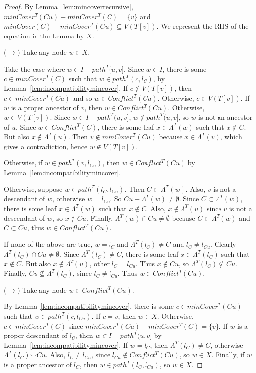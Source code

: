 \documentclass[final,1p,times]{elsarticle}
\newcommand{\compatible}{\smile}
\newcommand{\leafset}{\Lambda}
\begin{document}
        \begin{proof}
            By Lemma~\ref{lem:mincoverrecursive}, $minCover^{T}(Cu) - minCover^{T}(C) = \{v\}$ and $minCover(C) - minCover^{T}(Cu) \subseteq V(T[v])$. We represent the RHS of the equation in the Lemma by $X$.

		($\longrightarrow$) Take any node $w \in X$.

            Take the case where $w \in I - path^{T}(u, v]$. Since $w \in I$, there is some $c \in minCover^{T}(C)$ such that $w \in path^{T}(c, l_{C})$, by Lemma~\ref{lem:incompatibilitymincover}. If $c \not\in V(T[v])$, then $c \in minCover^{T}(Cu)$ and so $w \in Conflict^{T}(Cu)$. Otherwise, $c \in V(T[v])$. If $w$ is a proper ancestor of $v$, then $w \in Conflict^{T}(Cu)$. Otherwise, $w \in V(T[v])$. Since $w \in I - path^{T}(u, v]$, $w \not\in path^{T}(u, v]$, so $w$ is not an ancestor of $u$. Since $w \in Conflict^{T}(C)$, there is some leaf $x \in \leafset^{T}(w)$ such that $x \not\in C$. But also $x \not\in \leafset^{T}(u)$. Then $v \not\in minCover^{T}(Cu)$ because $x \in \leafset^{T}(v)$, which gives a contradiction, hence $w \not\in V(T[v])$.

            Otherwise, if $w \in path^{T}(v, l_{Cu})$, then $w \in Conflict^{T}(Cu)$ by Lemma~\ref{lem:incompatibilitymincover}.

            Otherwise, suppose $w \in path^{T}(l_C, l_{Cu})$. Then $C \subset \leafset^{T}(w)$. Also, $v$ is not a descendant of $w$, otherwise $w = l_{Cu}$. So $Cu - \leafset^{T}(w) \neq \emptyset$. Since $C \subset \leafset^{T}(w)$, there is some leaf $x \in \leafset^{T}(w)$ such that $x \not\in C$. Also, $x \not\in \leafset^{T}(u)$ since $v$ is not a descendant of $w$, so $x \not\in Cu$. Finally, $\leafset^{T}(w) \cap Cu \neq \emptyset$ because $C \subset \leafset^{T}(w)$ and $C \subset Cu$, thus $w \in Conflict^{T}(Cu)$.

            If none of the above are true, $w = l_C$ and $\leafset^{T}(l_C) \neq C$ and $l_C \neq l_{Cu}$. Clearly $\leafset^{T}(l_C) \cap Cu \neq \emptyset$. Since $\leafset^{T}(l_C) \neq C$, there is some leaf $x \in \leafset^{T}(l_C)$ such that $x \not\in C$. But also $x \not\in \leafset^{T}(u)$, other $l_C = l_{Cu}$. Thus $x \not\in Cu$, so $\leafset^{T}(l_C) \not\subseteq Cu$. Finally, $Cu \not\subseteq \leafset^{T}(l_C)$, since $l_C \neq l_{Cu}$. Thus $w \in Conflict^{T}(Cu)$.

		($\longrightarrow$) Take any node $w \in Conflict^{T}(Cu)$.

            By Lemma~\ref{lem:incompatibilitymincover}, there is some $c \in minCover^{T}(Cu)$ such that $w \in path^{T}(c, l_{Cu})$. If $c = v$, then $w \in X$. Otherwise, $c \in minCover^{T}(C)$ since $minCover^{T}(Cu) - minCover^{T}(C) = \{v\}$. If $w$ is a proper descendant of $l_C$, then $w \in I - path^{T}(u, v]$ by Lemma~\ref{lem:incompatibilitymincover}. If $w = l_C$, then $\leafset^{T}(l_C) \neq C$, otherwise $\leafset^{T}(l_C) \compatible Cu$. Also, $l_C \neq l_{Cu}$, since $l_{Cu} \not\in Conflict^{T}(Cu)$, so $w \in X$. Finally, if $w$ is a proper ancestor of $l_C$, then $w \in path^{T}(l_C, l_{Cu})$, so $w \in X$.
        \end{proof}
\end{document}
